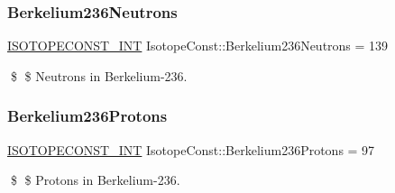 \subsubsection{\texorpdfstring{Berkelium236\+Neutrons}{Berkelium236Neutrons}}
{\footnotesize\ttfamily \mbox{\hyperlink{group___isotope_const-_macros_ga5f18360b3e99483a35c32d789e62621c}{I\+S\+O\+T\+O\+P\+E\+C\+O\+N\+S\+T\+\_\+\+I\+NT}} Isotope\+Const\+::\+Berkelium236\+Neutrons = 139}

\$ \$ Neutrons in Berkelium-\/236. \mbox{\label{group___isotope_const-_berkelium-_bk236_ga96acfaff2fc6f723299b9f71ca7e1a56}} 
\subsubsection{\texorpdfstring{Berkelium236\+Protons}{Berkelium236Protons}}
{\footnotesize\ttfamily \mbox{\hyperlink{group___isotope_const-_macros_ga5f18360b3e99483a35c32d789e62621c}{I\+S\+O\+T\+O\+P\+E\+C\+O\+N\+S\+T\+\_\+\+I\+NT}} Isotope\+Const\+::\+Berkelium236\+Protons = 97}

\$ \$ Protons in Berkelium-\/236. 